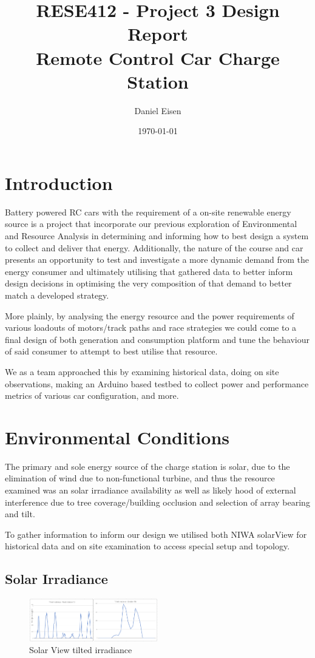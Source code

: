 \documentclass[11pt]{article}
\title{RESE412 - Project 3 Design Report \\ Remote Control Car Charge Station}
\author{Daniel Eisen}
\date{\today}
\begin{document}
\maketitle
\section{Introduction}
Battery powered RC cars with the requirement of a on-site renewable energy source is a project that incorporate our previous exploration of Environmental and Resource Analysis in determining and informing how to best design a system to collect and deliver that energy. Additionally, the nature of the course and car presents an opportunity to test and investigate a more dynamic demand from the energy consumer and ultimately utilising that gathered data to better inform design decisions in optimising the very composition of that demand to better match a developed strategy.

More plainly, by analysing the energy resource and the power requirements of various loadouts of motors/track paths and race strategies we could come to a final design of both generation and consumption platform and tune the behaviour of said consumer to attempt to best utilise that resource.  

We as a team approached this by examining historical data, doing on site observations, making an Arduino based testbed to collect power and performance metrics of various car configuration, and more.   

\section{Environmental Conditions}
The primary and sole energy source of the charge station is solar, due to the elimination of wind due to non-functional turbine, and thus the resource examined was an solar irradiance availability as well as likely hood of external interference due to tree coverage/building occlusion and selection of array bearing and tilt.

To gather information to inform our design we utilised both NIWA solarView \cite{solarview} for historical data and on site examination to access special setup and topology.

\subsection{Solar Irradiance}
\begin{figure}[h!]
    \begin{center}
        \includegraphics[width=0.5\textwidth]{inc/irr.png}
        \caption{Solar View tilted irradiance}
        \label{fig:solarview}
    \end{center}
\end{figure}
\end{document}
